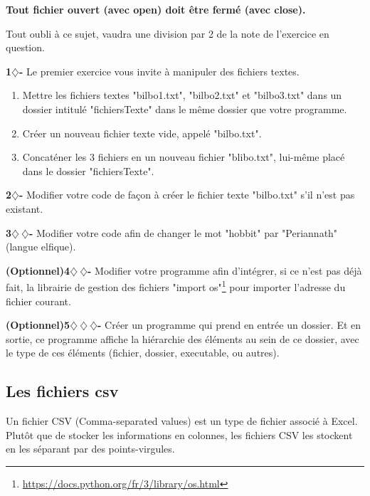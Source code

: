 \begin{tcolorbox}[lefttitle=2cm, colframe=gray!50!red, title= \textbf{ WARNING}]
\textbf{Tout fichier ouvert (avec open) doit être fermé  (avec close).}

Tout oubli à ce sujet, vaudra une division par 2 de la note de l'exercice en question.
\end{tcolorbox}


\begin{tcolorbox}[lefttitle=2cm, colframe=gray!75!black, title= \textbf{Exercices}]
\textbf{1$\diamondsuit$-}
Le premier exercice vous invite à manipuler des fichiers textes.

\begin{enumerate}
    \item Mettre les fichiers textes "bilbo1.txt", "bilbo2.txt" et "bilbo3.txt" dans un dossier intitulé "fichiersTexte" dans le même dossier que votre programme. 
    \item Créer un nouveau fichier texte vide, appelé "bilbo.txt".
    \item Concaténer les 3 fichiers en un nouveau fichier "blibo.txt", lui-même placé dans le dossier "fichiersTexte".
\end{enumerate}

\textbf{2$\diamondsuit$-}
Modifier votre code de façon à créer le fichier texte "bilbo.txt" s'il n'est pas existant.

\textbf{3$\diamondsuit~\diamondsuit$-}
Modifier votre code afin de changer le mot "hobbit" par "Periannath" (langue elfique).

\textbf{(Optionnel)4$\diamondsuit~\diamondsuit$-}
Modifier votre programme afin d'intégrer, si ce n'est pas déjà fait, la librairie de gestion des fichiers "import os"\footnote{\url{https://docs.python.org/fr/3/library/os.html}} pour importer l'adresse du fichier courant. 

\textbf{(Optionnel)5$\diamondsuit~\diamondsuit~\diamondsuit$-}
Créer un programme qui prend en entrée un dossier. Et en sortie, ce programme affiche la hiérarchie des éléments au sein de ce dossier, avec le type de ces éléments (fichier, dossier, executable, ou autres).

\end{tcolorbox}

\subsection{Les fichiers csv}

Un fichier CSV (Comma-separated values) est un type de fichier associé à Excel. Plutôt que de stocker les informations en colonnes, les fichiers CSV les stockent en les séparant par des points-virgules.

